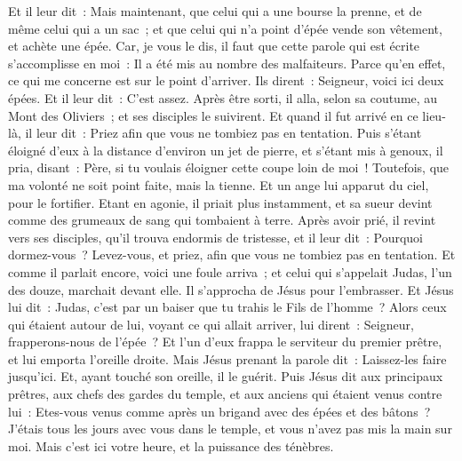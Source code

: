\begin{multicols}{2}
Et il leur dit~: Mais maintenant, que celui qui a une bourse la prenne, et de même celui qui a un sac~; et que celui qui n'a point d'épée vende son vêtement, et achète une épée.
Car, je vous le dis, il faut que cette parole qui est écrite s'accomplisse en moi~: Il a été mis au nombre des malfaiteurs. Parce qu'en effet, ce qui me concerne est sur le point d'arriver.
Ils dirent~: Seigneur, voici ici deux épées. Et il leur dit~: C'est assez.
Après être sorti, il alla, selon sa coutume, au Mont des Oliviers~; et ses disciples le suivirent.
Et quand il fut arrivé en ce lieu-là, il leur dit~: Priez afin que vous ne tombiez pas en tentation.
Puis s'étant éloigné d'eux à la distance d'environ un jet de pierre, et s'étant mis à genoux, il pria,
disant~: Père, si tu voulais éloigner cette coupe loin de moi~! Toutefois, que ma volonté ne soit point faite, mais la tienne.
Et un ange lui apparut du ciel, pour le fortifier.
Etant en agonie, il priait plus instamment, et sa sueur devint comme des grumeaux de sang qui tombaient à terre.
Après avoir prié, il revint vers ses disciples, qu'il trouva endormis de tristesse,
et il leur dit~: Pourquoi dormez-vous~? Levez-vous, et priez, afin que vous ne tombiez pas en tentation.
Et comme il parlait encore, voici une foule arriva~; et celui qui s'appelait Judas, l'un des douze, marchait devant elle. Il s'approcha de Jésus pour l'embrasser.
Et Jésus lui dit~: Judas, c'est par un baiser que tu trahis le Fils de l'homme~?
Alors ceux qui étaient autour de lui, voyant ce qui allait arriver, lui dirent~: Seigneur, frapperons-nous de l'épée~?
Et l'un d'eux frappa le serviteur du premier prêtre, et lui emporta l'oreille droite.
Mais Jésus prenant la parole dit~: Laissez-les faire jusqu'ici. Et, ayant touché son oreille, il le guérit.
Puis Jésus dit aux principaux prêtres, aux chefs des gardes du temple, et aux anciens qui étaient venus contre lui~: Etes-vous venus comme après un brigand avec des épées et des bâtons~?
J'étais tous les jours avec vous dans le temple, et vous n'avez pas mis la main sur moi. Mais c'est ici votre heure, et la puissance des ténèbres.

\end{multicols}
